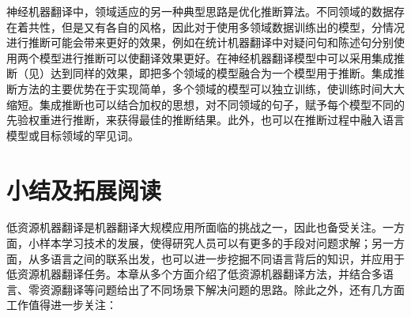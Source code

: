 \parinterval 神经机器翻译中，领域适应的另一种典型思路是优化推断算法。不同领域的数据存在着共性，但是又有各自的风格，因此对于使用多领域数据训练出的模型，分情况进行推断可能会带来更好的效果，例如在统计机器翻译中对疑问句和陈述句分别使用两个模型进行推断可以使翻译效果更好。在神经机器翻译模型中可以采用集成推断（见{\chapterfourteen}）达到同样的效果，即把多个领域的模型融合为一个模型用于推断。集成推断方法的主要优势在于实现简单，多个领域的模型可以独立训练，使训练时间大大缩短。集成推断也可以结合加权的思想，对不同领域的句子，赋予每个模型不同的先验权重进行推断，来获得最佳的推断结果。此外，也可以在推断过程中融入语言模型或目标领域的罕见词。

\sectionnewpage
\section{小结及拓展阅读}

低资源机器翻译是机器翻译大规模应用所面临的挑战之一，因此也备受关注。一方面，小样本学习技术的发展，使得研究人员可以有更多的手段对问题求解；另一方面，从多语言之间的联系出发，也可以进一步挖掘不同语言背后的知识，并应用于低资源机器翻译任务。本章从多个方面介绍了低资源机器翻译方法，并结合多语言、零资源翻译等问题给出了不同场景下解决问题的思路。除此之外，还有几方面工作值得进一步关注：

